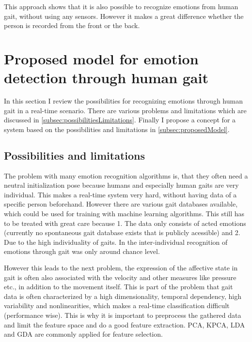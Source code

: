 \documentclass[conference]{IEEEtran}
\begin{document}
This approach shows that it is also possible to recognize emotions from human gait, without using any sensors. However it makes a great difference whether the person is recorded from the front or the back.


\section{Proposed model for emotion detection through human gait}
\label{sec:proposal}
In this section I review the possibilities for recognizing emotions through human gait in a real-time scenario. There are various problems and limitations which are discussed in \autoref{subsec:possibilitiesLimitations}. Finally I propose a concept for a system based on the possibilities and limitations in \autoref{subsec:proposedModel}.

\subsection{Possibilities and limitations}
\label{subsec:possibilitiesLimitations}
The problem with many emotion recognition algorithms is, that they often need a neutral initialization pose\cite{li2016emotion,cui2016emotion} because humans and especially human gaits are very individual. This makes a real-time system very hard, without having data of a specific person beforehand. However there are various gait databases available\cite{wang2008recognizing,karg2009comparison}, which could be used for training with machine learning algorithms. This still has to be treated with great care because 1. The data only consists of acted emotions (currently no spontaneous gait database exists that is publicly acessible) and 2. Due to the high individuality of gaits\cite{karg2012pattern,janssen2008recognition}. In \cite{janssen2008recognition} the inter-individual recognition of emotions through gait was only around chance level.

However this leads to the next problem, the expression of the affective state in gait is often also associated with the velocity\cite{crane2007motion,pollick2001perceiving,roether2009critical} and other measures like pressure etc., in addition to the movement itself. This is part of the problem that gait data is often characterized by a high dimensionality, temporal dependency, high variability and nonlinearities\cite{karg2012pattern}, which makes a real-time classification difficult (performance wise). This is why it is important to preprocess the gathered data and limit the feature space and do a good feature extraction. PCA, KPCA, LDA and GDA are commonly applied for feature selection\cite{karg2012pattern}.\
\end{document}
